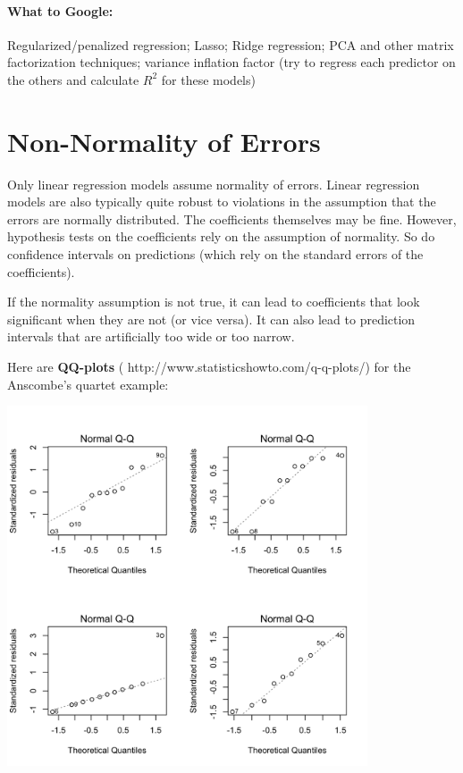 \vspace{25mm}

\paragraph{What to Google:} Regularized/penalized regression; Lasso; Ridge regression; PCA and other matrix factorization techniques; variance inflation factor (try to regress each predictor on the others and calculate $R^2$ for these models)

\newpage


\section{Non-Normality of Errors}

Only linear regression models assume normality of errors. Linear regression models are also typically quite robust to violations in the assumption that the errors are normally distributed. The coefficients themselves may be fine. However, hypothesis tests on the coefficients rely on the assumption of normality. So do confidence intervals on predictions (which rely on the standard errors of the coefficients). 

If the normality assumption is not true, it can lead to coefficients that look significant when they are not (or vice versa). It can also lead to prediction intervals that are artificially too wide or too narrow. 

Here are \textbf{QQ-plots} ({\color{blue} http://www.statisticshowto.com/q-q-plots/}) for the Anscombe's quartet example: \\[-10mm]
\begin{center}
\includegraphics[width=0.8\textwidth]{img/anscombe-diagnostics-2.png}
\end{center}
\vspace{-8mm}
